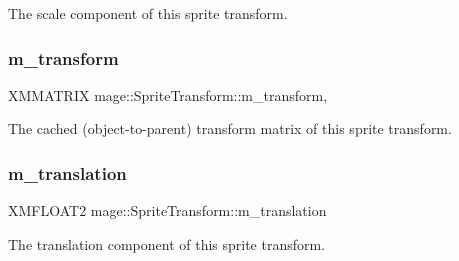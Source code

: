 The scale component of this sprite transform. \hypertarget{structmage_1_1_sprite_transform_ad2fec50a82772514da9399ff31703f3d}{}\label{structmage_1_1_sprite_transform_ad2fec50a82772514da9399ff31703f3d} 
\subsubsection{\texorpdfstring{m\+\_\+transform}{m\_transform}}
{\footnotesize\ttfamily X\+M\+M\+A\+T\+R\+IX mage\+::\+Sprite\+Transform\+::m\+\_\+transform\hspace{0.3cm}{\ttfamily [mutable]}, {\ttfamily [private]}}

The cached (object-\/to-\/parent) transform matrix of this sprite transform. \hypertarget{structmage_1_1_sprite_transform_a7642907ec8ae9685bb7c56675607045b}{}\label{structmage_1_1_sprite_transform_a7642907ec8ae9685bb7c56675607045b} 
\subsubsection{\texorpdfstring{m\+\_\+translation}{m\_translation}}
{\footnotesize\ttfamily X\+M\+F\+L\+O\+A\+T2 mage\+::\+Sprite\+Transform\+::m\+\_\+translation\hspace{0.3cm}{\ttfamily [private]}}

The translation component of this sprite transform. 